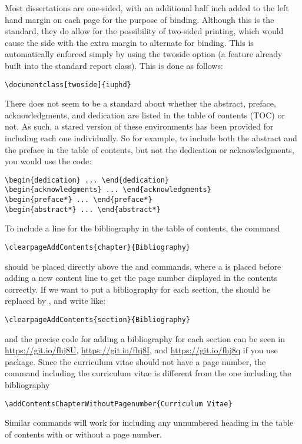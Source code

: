 Most dissertations are one-sided, with an additional half inch added to the left hand margin on each page for the purpose of binding.
Although this is the standard, they do allow for the possibility of two-sided printing, which would cause the side with the extra margin
to alternate for binding.  This is automatically enforced simply by using the twoside option (a feature already built into the
standard report class). This is done as follows:
\begin{verbatim}
\documentclass[twoside]{iuphd}
\end{verbatim}
There does not seem to be a standard about whether the abstract, preface, acknowledgments, and dedication are listed in the table of
contents (TOC) or not.  As such, a stared version of these environments has been provided for including each one individually.
So for example, to include
both the abstract and the preface in the table of contents, but not the dedication or acknowledgments, you would use the code:
\begin{verbatim}
\begin{dedication} ... \end{dedication}
\begin{acknowledgments} ... \end{acknowledgments}
\begin{preface*} ... \end{preface*}
\begin{abstract*} ... \end{abstract*}
\end{verbatim}
To include a line for the bibliography in the table of contents, the command
\begin{verbatim}
\clearpageAddContents{chapter}{Bibliography}
\end{verbatim}
should be placed directly above the  and  commands,
where a  is placed before adding a new content line to get the page number displayed in the contents correctly.
If we want to put a bibliography for each section, the  should be replaced by , and write like:
\begin{verbatim}
\clearpageAddContents{section}{Bibliography}
\end{verbatim}
and the precise code for adding a bibliography for each section can be seen in \url{https://git.io/fhj8U}, \url{https://git.io/fhj8I}, and \url{https://git.io/fhj8q} if you use  package.
Since the curriculum vitae should not have a page number, the command including the curriculum vitae is different from the one including the bibliography
\begin{verbatim}
\addContentsChapterWithoutPagenumber{Curriculum Vitae}
\end{verbatim}
Similar commands will work for including any unnumbered heading in the table of contents with or without a page number.


